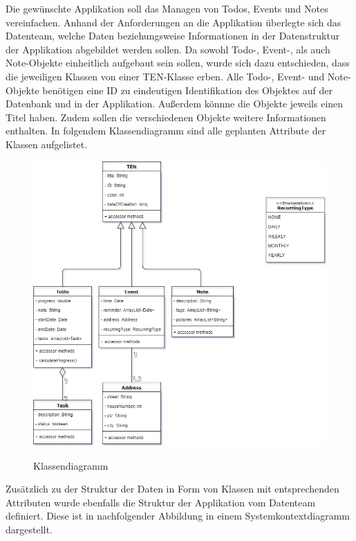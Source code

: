 Die gewünschte Applikation soll das Managen von Todos, Events und Notes vereinfachen. Anhand der Anforderungen an die Applikation überlegte sich das Datenteam, welche Daten beziehungsweise Informationen in der Datenstruktur der Applikation abgebildet werden sollen. Da sowohl Todo-, Event-, als auch Note-Objekte einheitlich aufgebaut sein sollen, wurde sich dazu entschieden, dass die jeweiligen Klassen von einer TEN-Klasse erben. Alle Todo-, Event- und Note-Objekte benötigen eine ID zu eindeutigen Identifikation des Objektes auf der Datenbank und in der Applikation. Außerdem könnne die Objekte jeweils einen Titel haben. Zudem sollen die verschiedenen Objekte weitere Informationen enthalten. In folgendem Klassendiagramm sind alle geplanten Attribute der Klassen aufgelistet.

\begin{figure}[H]
\centering
\begin{minipage}[t]{1\textwidth} %
\caption{Klassendiagramm} %
\includegraphics[width=1\textwidth]{img/Klassendiagramm}\\ %
\end{minipage}
\end{figure}

Zusätzlich zu der Struktur der Daten in Form von Klassen mit entsprechenden Attributen wurde ebenfalls die Struktur der Applikation vom Datenteam definiert. Diese ist in nachfolgender Abbildung in einem Systemkontextdiagramm dargestellt.

